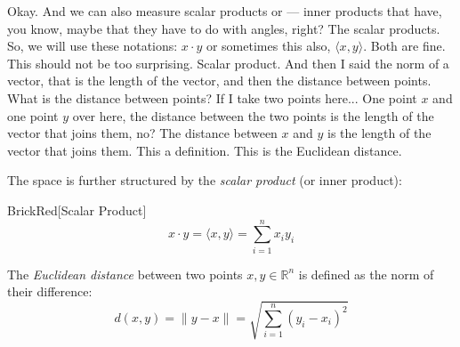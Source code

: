 \begin{spoken-clean}[00:22:37 - 00:24:42]
Okay. And we can also measure scalar products or --- inner products that have, you know, maybe that they have to do with angles, right? The scalar products. So, we will use these notations: $x \cdot y$ or sometimes this also, $\langle x, y \rangle$. Both are fine.  This should not be too surprising. Scalar product. And then I said the norm of a vector, that is the length of the vector, and then the distance between points. What is the distance between points? If I take two points here...  One point $x$ and one point $y$ over here, the distance between the two points is the length of the vector that joins them, no? The distance between $x$ and $y$ is the length of the vector that joins them. This a definition. This is the Euclidean distance.
\end{spoken-clean}

\begin{math-stroke}
The space is further structured by the \emph{scalar product} (or inner product):
\begin{color-box}{BrickRed}[Scalar Product]
\[ x \cdot y = \langle x, y \rangle = \sum_{i=1}^n x_i y_i \]
\end{color-box}

The \emph{Euclidean distance} between two points $x, y \in \mathbb{R}^n$ is defined as the norm of their difference:
\begin{equation} \label{eq:distance_def}
d(x, y) = \|y - x\| = \sqrt{\sum_{i=1}^n (y_i - x_i)^2}
\end{equation}

\begin{center}
\end{center}
\end{math-stroke}

